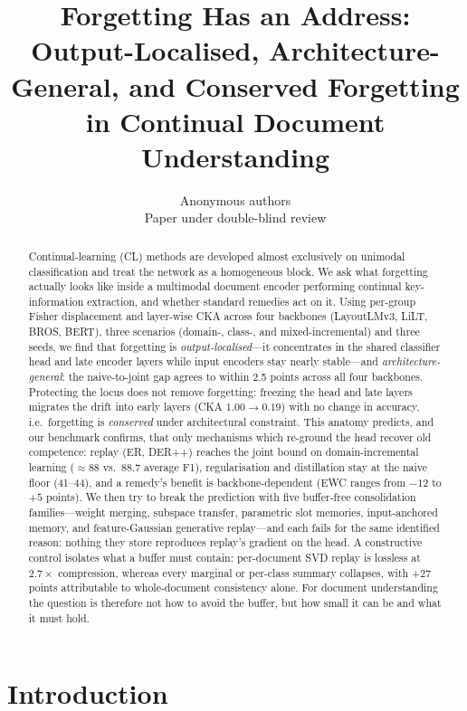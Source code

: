 \documentclass{article}
\title{Forgetting Has an Address: Output-Localised, Architecture-General, and Conserved Forgetting in Continual Document Understanding}
\author{Anonymous authors\\Paper under double-blind review}
\begin{document}
\maketitle

\begin{abstract}
Continual-learning (CL) methods are developed almost exclusively on unimodal classification and treat the network as a homogeneous block. We ask what forgetting actually looks like inside a multimodal document encoder performing continual key-information extraction, and whether standard remedies act on it. Using per-group Fisher displacement and layer-wise CKA across four backbones (LayoutLMv3, LiLT, BROS, BERT), three scenarios (domain-, class-, and mixed-incremental) and three seeds, we find that forgetting is \emph{output-localised}---it concentrates in the shared classifier head and late encoder layers while input encoders stay nearly stable---and \emph{architecture-general}: the naive-to-joint gap agrees to within 2.5 points across all four backbones. Protecting the locus does not remove forgetting: freezing the head and late layers migrates the drift into early layers (CKA $1.00\rightarrow0.19$) with no change in accuracy, i.e.\ forgetting is \emph{conserved} under architectural constraint. This anatomy predicts, and our benchmark confirms, that only mechanisms which re-ground the head recover old competence: replay (ER, DER++) reaches the joint bound on domain-incremental learning ($\approx$88 vs.\ 88.7 average F1), regularisation and distillation stay at the naive floor (41--44), and a remedy's benefit is backbone-dependent (EWC ranges from $-12$ to $+5$ points). We then try to break the prediction with five buffer-free consolidation families---weight merging, subspace transfer, parametric slot memories, input-anchored memory, and feature-Gaussian generative replay---and each fails for the same identified reason: nothing they store reproduces replay's gradient on the head. A constructive control isolates what a buffer must contain: per-document SVD replay is lossless at $2.7\times$ compression, whereas every marginal or per-class summary collapses, with +27 points attributable to whole-document consistency alone. For document understanding the question is therefore not how to avoid the buffer, but how small it can be and what it must hold.
\end{abstract}

\section{Introduction}
\label{sec:intro}
\end{document}
